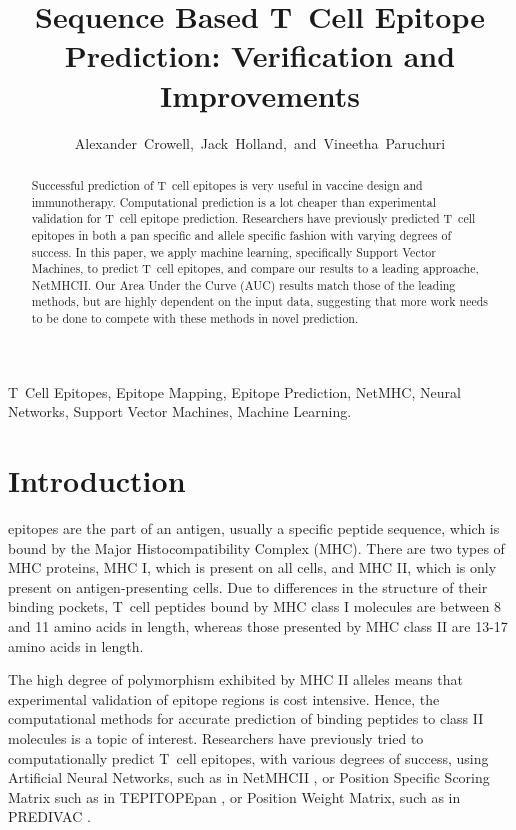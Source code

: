 \documentclass[journal]{IEEEtran}
\begin{document}
\title{Sequence Based T~Cell Epitope Prediction: Verification and Improvements}

\author{Alexander~Crowell,~Jack~Holland,~and~Vineetha~Paruchuri}


\maketitle


\begin{abstract}
Successful prediction of T~cell epitopes is very useful in vaccine design and immunotherapy. Computational prediction is a lot cheaper than experimental validation for T~cell epitope prediction. Researchers have previously predicted T~cell epitopes in both a pan specific and allele specific fashion with varying degrees of success. In this paper, we apply machine learning, specifically Support Vector Machines, to predict T~cell epitopes, and compare our results to a leading approache, NetMHCII. Our Area Under the Curve (AUC) results match those of the leading methods, but are highly dependent on the input data, suggesting that more work needs to be done to compete with these methods in novel prediction.
\end{abstract}


\begin{IEEEkeywords}
T~Cell Epitopes, Epitope Mapping, Epitope Prediction, NetMHC, Neural Networks, Support Vector Machines, Machine Learning.
\end{IEEEkeywords}





\section{Introduction}

 epitopes are the part of an antigen, usually a specific peptide sequence, which is bound by the Major Histocompatibility Complex (MHC). There are two types of MHC proteins, MHC I, which is present on all cells, and MHC II, which is only present on antigen-presenting cells. Due to differences in the structure of their binding pockets, T~cell peptides bound by MHC class I molecules are between 8 and 11 amino acids in length, whereas those presented by MHC class II are 13-17 amino acids in length. 

The high degree of polymorphism exhibited by MHC II alleles means that experimental validation of epitope regions is cost intensive. Hence, the computational methods for accurate prediction of binding peptides to class II molecules is a topic of interest. Researchers have previously tried to computationally predict T~cell epitopes, with various degrees of success, using Artificial Neural Networks, such as in NetMHCII \cite{NetMHCII}, or Position Specific Scoring Matrix such as in TEPITOPEpan \cite{TEPITOPEpan}, or Position Weight Matrix, such as in PREDIVAC \cite{PREDIVAC}. 
\end{document}
